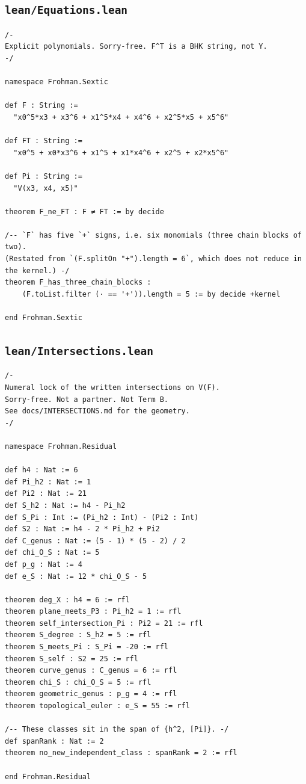 \documentclass[11pt]{amsart}
\theoremstyle{definition}
\theoremstyle{remark}
\begin{document}
\subsection*{\texttt{lean/Equations.lean}}
\begin{verbatim}
/-
Explicit polynomials. Sorry-free. F^T is a BHK string, not Y.
-/

namespace Frohman.Sextic

def F : String :=
  "x0^5*x3 + x3^6 + x1^5*x4 + x4^6 + x2^5*x5 + x5^6"

def FT : String :=
  "x0^5 + x0*x3^6 + x1^5 + x1*x4^6 + x2^5 + x2*x5^6"

def Pi : String :=
  "V(x3, x4, x5)"

theorem F_ne_FT : F ≠ FT := by decide

/-- `F` has five `+` signs, i.e. six monomials (three chain blocks of two).
(Restated from `(F.splitOn "+").length = 6`, which does not reduce in the kernel.) -/
theorem F_has_three_chain_blocks :
    (F.toList.filter (· == '+')).length = 5 := by decide +kernel

end Frohman.Sextic
\end{verbatim}
\subsection*{\texttt{lean/Intersections.lean}}
\begin{verbatim}
/-
Numeral lock of the written intersections on V(F).
Sorry-free. Not a partner. Not Term B.
See docs/INTERSECTIONS.md for the geometry.
-/

namespace Frohman.Residual

def h4 : Nat := 6
def Pi_h2 : Nat := 1
def Pi2 : Nat := 21
def S_h2 : Nat := h4 - Pi_h2
def S_Pi : Int := (Pi_h2 : Int) - (Pi2 : Int)
def S2 : Nat := h4 - 2 * Pi_h2 + Pi2
def C_genus : Nat := (5 - 1) * (5 - 2) / 2
def chi_O_S : Nat := 5
def p_g : Nat := 4
def e_S : Nat := 12 * chi_O_S - 5

theorem deg_X : h4 = 6 := rfl
theorem plane_meets_P3 : Pi_h2 = 1 := rfl
theorem self_intersection_Pi : Pi2 = 21 := rfl
theorem S_degree : S_h2 = 5 := rfl
theorem S_meets_Pi : S_Pi = -20 := rfl
theorem S_self : S2 = 25 := rfl
theorem curve_genus : C_genus = 6 := rfl
theorem chi_S : chi_O_S = 5 := rfl
theorem geometric_genus : p_g = 4 := rfl
theorem topological_euler : e_S = 55 := rfl

/-- These classes sit in the span of {h^2, [Pi]}. -/
def spanRank : Nat := 2
theorem no_new_independent_class : spanRank = 2 := rfl

end Frohman.Residual
\end{verbatim}
\end{document}
